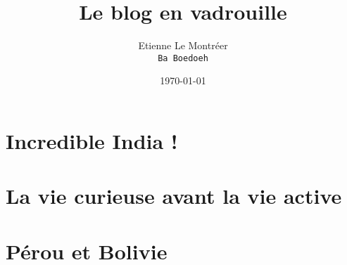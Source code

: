 \documentclass[a5paper, 10pt]{book}
\begin{document}
\frontmatter
\title{Le blog en vadrouille}
\author{Etienne Le Montr\'eer\\
\texttt{Ba Boedoeh}}
\date{\today}

\maketitle

\tableofcontents

\mainmatter

\chapter{Incredible India !}

\pagebreak
\pagebreak
\pagebreak
\pagebreak
\pagebreak
\pagebreak
\pagebreak
\pagebreak
\pagebreak
\pagebreak
\pagebreak

\chapter{La vie curieuse avant la vie active}

\pagebreak
\pagebreak
\pagebreak
\pagebreak
\pagebreak
\pagebreak
\pagebreak
\pagebreak
\pagebreak
\pagebreak
\pagebreak
\pagebreak
\pagebreak
\pagebreak
\pagebreak
\pagebreak
\pagebreak
\pagebreak

\chapter{Pérou et Bolivie}


\pagebreak
\pagebreak
\pagebreak
\end{document}
